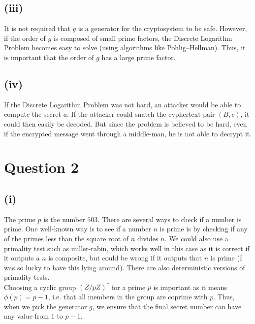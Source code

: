 \documentclass[a4paper, fleqn]{article}
\begin{document}
\subsection{(iii)}\label{ref1}
It is not required that $g$ is a generator for the cryptosystem to be safe. However, if the order of $g$ is composed of small prime factors, the Discrete Logarithm Problem becomes easy to solve (using algorithms like Pohlig–Hellman). Thus, it is important that the order of $g$ has a large prime factor.

\subsection{(iv)}
If the Discrete Logarithm Problem was not hard, an attacker would be able to compute the secret $a$. If the attacker could snatch the cyphertext pair $(B, c)$, it could then easily be decoded. But since the problem is believed to be hard, even if the encrypted message went through a middle-man, he is not able to decrypt it.

\section{Question 2}

\subsection{(i)}
The prime $p$ is the number $503$. There are several ways to check if a number is prime. One well-known way is to see if a number $n$ is prime is by checking if any of the primes less than the square root of $n$ divides $n$. We could also use a primality test such as miller-rabin, which works well in this case as it is correct if it outputs a $n$ is composite, but could be wrong if it outputs that $n$ is prime (I was so lucky to have this lying around). There are also deterministic versions of primality tests. \\
Choosing a cyclic group $(Z/pZ)^*$ for a prime $p$ is important as it means $\phi(p)=p-1$, i.e. that all members in the group are coprime with $p$. Thus, when we pick the generator $g$, we ensure that the final secret number can have any value from $1$ to $p-1$.
\end{document}

